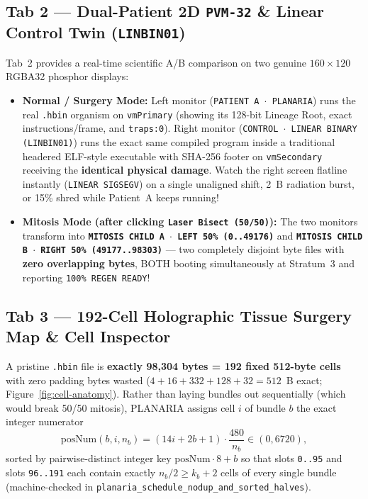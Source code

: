 \documentclass[10pt,letterpaper]{article}
\begin{document}
\subsection{Tab 2 --- Dual-Patient 2D \texttt{PVM-32} \& Linear Control Twin (\texttt{LINBIN01})}
\label{sec:tab2}

Tab~2 provides a real-time scientific A/B comparison on two genuine $160\times 120$ RGBA32 phosphor displays:
\begin{itemize}[leftmargin=1.5em, itemsep=1.5pt]
  \item \textbf{Normal / Surgery Mode:} Left monitor (\texttt{PATIENT A $\cdot$ PLANARIA}) runs the real \texttt{.hbin} organism on \texttt{vmPrimary} (showing its 128-bit Lineage Root, exact instructions/frame, and \texttt{traps:0}). Right monitor (\texttt{CONTROL $\cdot$ LINEAR BINARY (LINBIN01)}) runs the exact same compiled program inside a traditional headered ELF-style executable with SHA-256 footer on \texttt{vmSecondary} receiving the \textbf{identical physical damage}. Watch the right screen flatline instantly (\texttt{LINEAR SIGSEGV}) on a single unaligned shift, 2~B radiation burst, or 15\% shred while Patient~A keeps running!
  \item \textbf{Mitosis Mode (after clicking \texttt{Laser Bisect (50/50)}):} The two monitors transform into \textbf{\texttt{MITOSIS CHILD A $\cdot$ LEFT 50\% (0..49176)}} and \textbf{\texttt{MITOSIS CHILD B $\cdot$ RIGHT 50\% (49177..98303)}} --- two completely disjoint byte files with \textbf{zero overlapping bytes}, BOTH booting simultaneously at Stratum~3 and reporting \texttt{100\% REGEN READY}!
\end{itemize}

\subsection{Tab 3 --- 192-Cell Holographic Tissue Surgery Map \& Cell Inspector}
\label{sec:tab3}

A pristine \texttt{.hbin} file is \textbf{exactly 98,304 bytes = 192 fixed 512-byte cells} with zero padding bytes wasted ($4 + 16 + 332 + 128 + 32 = 512$~B exact; Figure~\ref{fig:cell-anatomy}). Rather than laying bundles out sequentially (which would break 50/50 mitosis), PLANARIA assigns cell $i$ of bundle $b$ the exact integer numerator
\begin{equation}
  \mathrm{posNum}(b, i, n_b) = (14i + 2b + 1)\cdot\frac{480}{n_b} \in (0, 6720),
\end{equation}
sorted by pairwise-distinct integer key $\mathrm{posNum}\cdot 8 + b$ so that slots \texttt{0..95} and slots \texttt{96..191} each contain exactly $n_b/2 \ge k_b + 2$ cells of every single bundle (machine-checked in \texttt{planaria\_schedule\_nodup\_and\_sorted\_halves}).
\end{document}
